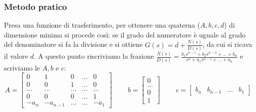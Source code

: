 \subsubsection{Metodo pratico}
Presa una funzione di trasferimento, per ottenere una quaterna ($A,b,c,d$) di dimensione minima si procede così: se il grado del numeratore è uguale al grado del denominatore si fa la divisione e si ottiene $G(s) = d + \frac{N(s)}{D(s)}$, da cui si ricava il valore $d$. A questo punto riscriviamo la frazione $\frac{N(s)}{D(s)} = \frac{ b_1 s^{n-1} + b_2 s^{n-2} + \dots + b_n }{ s^n + a_1 s^{n-1} + \dots + a_n }$ e scriviamo le $A, b$ e $c$:
\[
    A=\left[\begin{matrix}
        0 & 1 & 0 & \dots & 0 \\
        0 & 0 & 1 & \dots & 0 \\
        \dots & \dots &\dots&\dots&\dots\\
        0 & 0 & 0 & \dots & 1\\
        -a_n & -a_{n-1} & \dots & \dots & -a_1
    \end{matrix}\right] \;\;\;\;\;\;\;\; b=\left[\begin{matrix}
        0\\\dots\\0\\1
    \end{matrix}\right] \;\;\;\;\;\;\;\; c=\left[\begin{matrix}
        b_n & b_{n-1} & \dots & b_1
    \end{matrix}\right]
\]